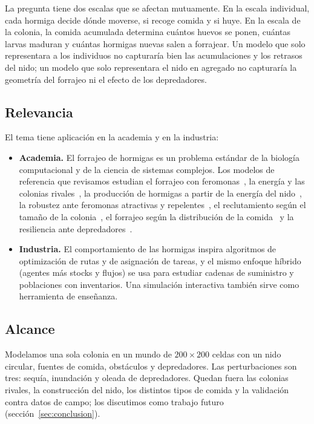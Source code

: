 \documentclass[11pt,a4paper]{article}
\begin{document}
La pregunta tiene dos escalas que se afectan mutuamente. En la escala individual, cada hormiga decide dónde moverse, si recoge comida y si huye. En la escala de la colonia, la comida acumulada determina cuántos huevos se ponen, cuántas larvas maduran y cuántas hormigas nuevas salen a forrajear. Un modelo que solo representara a los individuos no capturaría bien las acumulaciones y los retrasos del nido; un modelo que solo representara el nido en agregado no capturaría la geometría del forrajeo ni el efecto de los depredadores.

\subsection{Relevancia}

El tema tiene aplicación en la academia y en la industria:

\begin{itemize}
  \item \textbf{Academia.} El forrajeo de hormigas es un problema estándar de la biología computacional y de la ciencia de sistemas complejos. Los modelos de referencia que revisamos estudian el forrajeo con feromonas~\cite{netlogoants}, la energía y las colonias rivales~\cite{antadaptation}, la producción de hormigas a partir de la energía del nido~\cite{ants2015}, la robustez ante feromonas atractivas y repelentes~\cite{holcombe}, el reclutamiento según el tamaño de la colonia~\cite{reclutamiento}, el forrajeo según la distribución de la comida~\cite{pogonomyrmex} y la resiliencia ante depredadores~\cite{vilnius}.
  \item \textbf{Industria.} El comportamiento de las hormigas inspira algoritmos de optimización de rutas y de asignación de tareas, y el mismo enfoque híbrido (agentes más stocks y flujos) se usa para estudiar cadenas de suministro y poblaciones con inventarios. Una simulación interactiva también sirve como herramienta de enseñanza.
\end{itemize}

\subsection{Alcance}

Modelamos una sola colonia en un mundo de $200\times200$ celdas con un nido circular, fuentes de comida, obstáculos y depredadores. Las perturbaciones son tres: sequía, inundación y oleada de depredadores. Quedan fuera las colonias rivales, la construcción del nido, los distintos tipos de comida y la validación contra datos de campo; los discutimos como trabajo futuro (sección~\ref{sec:conclusion}).
\end{document}
